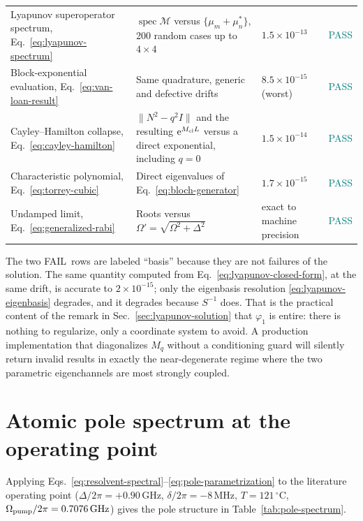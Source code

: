 \documentclass[11pt,a4paper]{article}
\newcommand{\e}{\mathrm e}
\newcommand{\GHz}{\,\mathrm{GHz}}
\newcommand{\MHz}{\,\mathrm{MHz}}
\newcommand{\degC}{\,^{\circ}\mathrm C}
\newcommand{\pass}{\textcolor{teal}{PASS}}
\newcommand{\fail}{\textcolor{red!70!black}{FAIL}}
\begin{document}
\begin{table}[ht]
\begin{tabularx}{\textwidth}{L{4.6cm}L{4.4cm}C{2.4cm}Y}
Lyapunov superoperator spectrum,
Eq.~\eqref{eq:lyapunov-spectrum} &
$\operatorname{spec}\mathcal M$ versus $\{\mu_m+\mu_n^*\}$, 200 random cases
up to $4\times4$ & $1.5\times10^{-13}$ & \pass\\
Block-exponential evaluation,
Eq.~\eqref{eq:van-loan-result} &
Same quadrature, generic and defective drifts &
$8.5\times10^{-15}$ (worst) & \pass\\
Cayley--Hamilton collapse,
Eq.~\eqref{eq:cayley-hamilton} &
$\|N^2-q^2I\|$ and the resulting $\e^{M_{\rm cl}L}$ versus a direct
exponential, including $q=0$ & $1.5\times10^{-14}$ & \pass\\
Characteristic polynomial,
Eq.~\eqref{eq:torrey-cubic} &
Direct eigenvalues of Eq.~\eqref{eq:bloch-generator} &
$1.7\times10^{-15}$ & \pass\\
Undamped limit,
Eq.~\eqref{eq:generalized-rabi} &
Roots versus $\Omega'=\sqrt{\Omega^2+\Delta^2}$ &
exact to machine precision & \pass\\
\bottomrule
\end{tabularx}
\end{table}

The two \fail\ rows are labeled ``basis'' because they are not failures of
the solution. The same quantity computed from
Eq.~\eqref{eq:lyapunov-closed-form}, at the same drift, is accurate to
$2\times10^{-15}$; only the eigenbasis resolution
\eqref{eq:lyapunov-eigenbasis} degrades, and it degrades because $S^{-1}$
does. That is the practical content of the remark in
Sec.~\ref{sec:lyapunov-solution} that $\varphi_1$ is entire: there is nothing
to regularize, only a coordinate system to avoid. A production
implementation that diagonalizes $M_q$ without a conditioning guard will
silently return invalid results in exactly the near-degenerate regime where
the two parametric eigenchannels are most strongly coupled.

\section{Atomic pole spectrum at the operating point}
\label{sec:pole-spectrum}

Applying Eqs.~\eqref{eq:resolvent-spectral}--\eqref{eq:pole-parametrization}
to the literature operating point
($\Delta/2\pi=+0.90\GHz$, $\delta/2\pi=-8\MHz$, $T=121\degC$,
$\Omega_{\rm pump}/2\pi=0.7076\GHz$) gives the pole structure in
Table~\ref{tab:pole-spectrum}.
\end{document}
